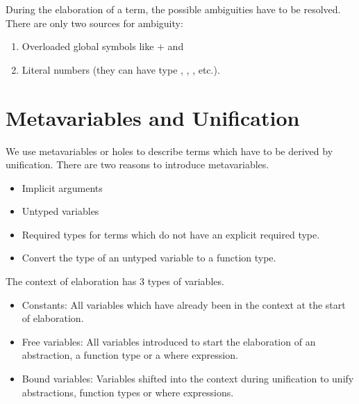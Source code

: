 During the elaboration of a term, the possible ambiguities have to be resolved.
There are only two sources for ambiguity:
%
\begin{enumerate}

\item Overloaded global symbols like $+$ and 

\item Literal numbers (they can have type , ,
, etc.).

\end{enumerate}








\section{Metavariables and Unification}

We use metavariables or holes to describe terms which have to be derived by
unification. There are two reasons to introduce metavariables.

\begin{itemize}

\item Implicit arguments

\item Untyped variables

\item Required types for terms which do not have an explicit required type.

\item Convert the type of an untyped variable to a function type.

\end{itemize}


The context of elaboration has 3 types of variables.

\begin{itemize}

\item Constants: All variables which have already been in the context at the
start of elaboration.

\item Free variables: All variables introduced to start the elaboration of an
abstraction, a function type or a where expression.

\item Bound variables: Variables shifted into the context during unification to
unify abstractions, function types or where expressions.

\end{itemize}

